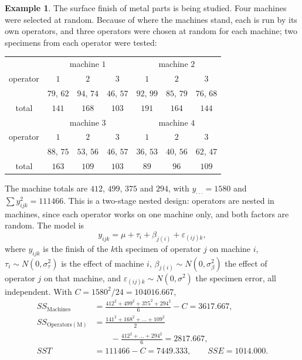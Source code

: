 \documentclass[11pt,a4paper]{article}
\numberwithin{equation}{section}
\theoremstyle{definition}
\newtheorem{exa}[thm]{Example}
\begin{document}
\begin{exa}\label{exa:machines}
The surface finish of metal parts is being studied. Four machines were selected at random. Because of where the machines stand, each is run by its
own operators, and three operators were chosen at random for each machine; two specimens from each operator were tested:
\begin{center}
\begin{tabular}{c|ccc|ccc}
& \multicolumn{3}{c|}{machine $1$} & \multicolumn{3}{c}{machine $2$} \\
operator & $1$ & $2$ & $3$ & $1$ & $2$ & $3$ \\
\hline
& $79$, $62$ & $94$, $74$ & $46$, $57$ & $92$, $99$ & $85$, $79$ & $76$, $68$ \\
total & $141$ & $168$ & $103$ & $191$ & $164$ & $144$ \\
\hline
\hline
& \multicolumn{3}{c|}{machine $3$} & \multicolumn{3}{c}{machine $4$} \\
operator & $1$ & $2$ & $3$ & $1$ & $2$ & $3$ \\
\hline
& $88$, $75$ & $53$, $56$ & $46$, $57$ & $36$, $53$ & $40$, $56$ & $62$, $47$ \\
total & $163$ & $109$ & $103$ & $89$ & $96$ & $109$
\end{tabular}
\end{center}
The machine totals are $412$, $499$, $375$ and $294$, with $y_{\cdot\cdot\cdot} = 1580$ and $\sum y_{ijk}^2 = 111466$. This is a two-stage nested design: operators are nested in machines,
since each operator works on one machine only, and both factors are random. The model is
\[
y_{ijk} = \mu + \tau_i + \beta_{j(i)} + \varepsilon_{(ij)k} ,
\]
where $y_{ijk}$ is the finish of the $k$th specimen of operator $j$ on machine $i$, $\tau_i \sim N(0, \sigma^2_\tau)$ is the effect of machine $i$, $\beta_{j(i)} \sim N(0, \sigma^2_\beta)$ the effect of operator $j$ on that machine,
and $\varepsilon_{(ij)k} \sim N(0, \sigma^2)$ the specimen error, all independent. With $C = 1580^2/24 = 104016.667$,
\begin{align*}
SS_{\mathrm{Machines}} &= \frac{412^2 + 499^2 + 375^2 + 294^2}6 - C = 3617.667 , \\
SS_{\mathrm{Operators(M)}} &= \frac{141^2 + 168^2 + \dots + 109^2}2 \\
&\qquad - \frac{412^2 + \dots + 294^2}6 = 2817.667 , \\
SST &= 111466 - C = 7449.333 , \qquad SSE = 1014.000 .
\end{align*}
\begin{center}

\end{center}
\end{exa}
\end{document}
